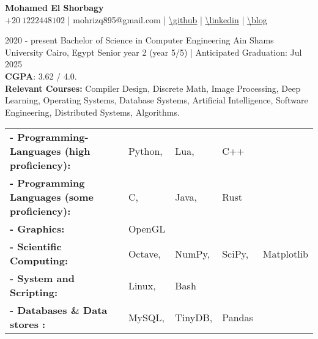 \documentclass[hidelinks]{report}
\begin{document}
\begin{center}
    \noindent \Huge{ \selectfont \bfseries Mohamed El Shorbagy}\\[.4em]
    \large
    $+20 \ 1222448102$           |
    mohrizq895@gmail.com         | 
    \underline{\url{\github}}    |
    \underline{\url{\linkedin}}  |
    \underline{\url{\blog}}  
\end{center}


\vspace{2mm}

\large
{}

\entry
    {2020 - present} 
    {Bachelor of Science in Computer Engineering }
    {Ain Shams University}
    {Cairo, Egypt  }
    {\textbullet Senior year 2 (year 5/5) | Anticipated Graduation: Jul 2025 \\ 
     \textbullet \textbf{CGPA}: 3.62 / 4.0. \\  
     \textbullet \textbf{Relevant Courses:} Compiler Design, Discrete Math, Image Processing, Deep Learning,
     Operating Systems, Database Systems, Artificial Intelligence, Software Engineering, Distributed Systems, 
     Algorithms. 
    }  


\vspace{2mm}



\begin{tabular}{ l l l l l}
      \bf{- Programming-Languages (high proficiency):} & Python, & Lua, & C++ \\ 
      \bf{- Programming Languages (some proficiency):} & C, & Java, & Rust \\ 
      \bf{- Graphics:} & OpenGL \\ 
      \bf{- Scientific Computing:} & Octave, & NumPy, & SciPy, & Matplotlib \\ 
      \bf{- System and Scripting:} & Linux, & Bash \\ 
      \bf{- Databases \& Data stores :} & MySQL, & TinyDB, & Pandas \\ 
       
\end{tabular}

\vspace{4mm}
\end{document}
